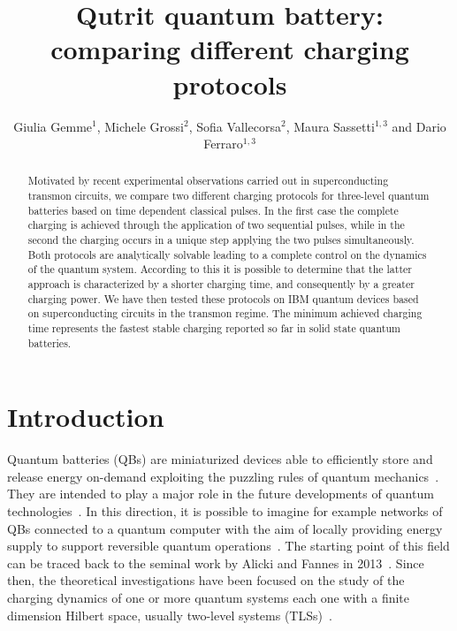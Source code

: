 \documentclass[12pt]{iopart}
\begin{document}
\title{Qutrit quantum battery: comparing different charging protocols}

\author{Giulia Gemme$^{1}$, Michele Grossi$^{2}$, Sofia Vallecorsa$^{2}$, Maura Sassetti$^{1,3}$ and Dario Ferraro$^{1,3}$}
\address{$^{1}$ Dipartimento di Fisica, Università di Genova, Via Dodecaneso 33, 16146 Genova, Italy\\
$^{2}$  CERN, 1 Esplanade des Particules, CH-1211 Geneva, Switzerland\\
$^{3}$  CNR-SPIN, Via Dodecaneso 33, 16146 Genova, Italy}

\begin{abstract}
Motivated by recent experimental observations carried out in superconducting transmon circuits, we compare two different charging protocols for three-level quantum batteries based on time dependent classical pulses. In the first case the complete charging is achieved through the application of two sequential pulses, while in the second the charging occurs in a unique step applying the two pulses simultaneously. Both protocols are analytically solvable leading to a complete control on the dynamics of the quantum system. According to this it is possible to determine that the latter approach is characterized by a shorter charging time, and consequently by a greater charging power. We have then tested these protocols on IBM quantum devices based on superconducting circuits in the transmon regime. The minimum achieved charging time represents the fastest stable charging reported so far in solid state quantum batteries. 
\end{abstract}

\maketitle

\section{Introduction}
Quantum batteries (QBs) are miniaturized devices able to efficiently store and release energy on-demand exploiting the puzzling rules of quantum mechanics~\cite{Campaioli18, Bhattacharjee21}. They are intended to play a major role in the future developments of quantum technologies~\cite{Polini22}. In this direction, it is possible to imagine for example networks of QBs connected to a quantum computer with the aim of locally providing energy supply to support reversible quantum operations~\cite{Chiribella21}. The starting point of this field can be traced back to the seminal work by Alicki and Fannes in 2013~\cite{Alicki13}. Since then, the theoretical investigations have been focused on the study of the charging dynamics of one or more quantum systems each one with a finite dimension Hilbert space, usually two-level systems (TLSs)~\cite{Binder15}. 
\end{document}
